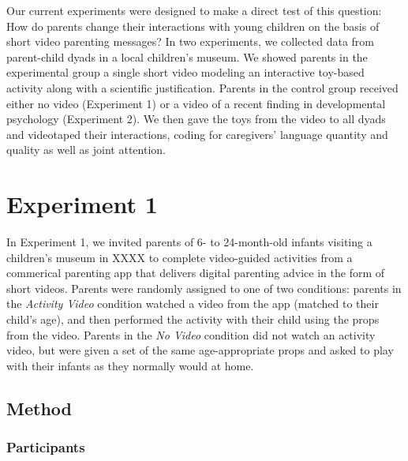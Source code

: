 \documentclass[
  english,
  man]{apa6}
\begin{document}
Our current experiments were designed to make a direct test of this question: How do parents change their interactions with young children on the basis of short video parenting messages?
In two experiments, we collected data from parent-child dyads in a local children's museum.
We showed parents in the experimental group a single short video modeling an interactive toy-based activity along with a scientific justification.
Parents in the control group received either no video (Experiment 1) or a video of a recent finding in developmental psychology (Experiment 2).
We then gave the toys from the video to all dyads and videotaped their interactions, coding for caregivers' language quantity and quality as well as joint attention.

\hypertarget{experiment-1}{%
\section{Experiment 1}\label{experiment-1}}

In Experiment 1, we invited parents of 6- to 24-month-old infants visiting a children's museum in XXXX to complete video-guided activities from a commerical parenting app that delivers digital parenting advice in the form of short videos.
Parents were randomly assigned to one of two conditions: parents in the \emph{Activity Video} condition watched a video from the app (matched to their child's age), and then performed the activity with their child using the props from the video.
Parents in the \emph{No Video} condition did not watch an activity video, but were given a set of the same age-appropriate props and asked to play with their infants as they normally would at home.

\hypertarget{method}{%
\subsection{Method}\label{method}}

\hypertarget{participants}{%
\subsubsection{Participants}\label{participants}}
\end{document}
